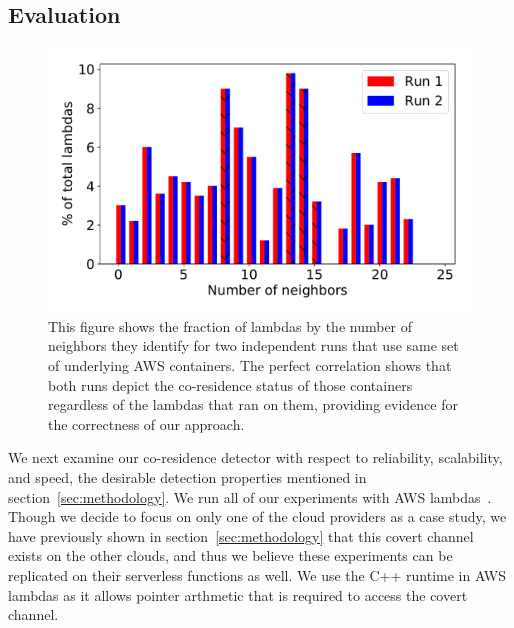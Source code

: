 \subsection{Evaluation}
\label{sec:eval}

\begin{figure}[!t]
  \includegraphics[width=.99\linewidth]{fig/correlation.pdf}
  \caption{This figure shows the fraction of lambdas by the number of neighbors 
  they identify for two independent runs that use same set of underlying AWS
  containers. The perfect correlation shows that both runs depict the co-residence 
  status of those containers regardless of the lambdas that ran on them, providing
  evidence for the correctness of our approach.
\label{fig:correlation}}
\end{figure}


We next examine our co-residence detector with respect to reliability,
scalability, and speed, the desirable detection properties mentioned in
section~\ref{sec:methodology}.  We run all of our experiments with AWS
lambdas~\cite{awscloud}. Though we decide to focus on only one of the cloud
providers as a case study, we have previously shown in
section~\ref{sec:methodology} that this covert channel exists on the other
clouds, and thus we believe these experiments can be replicated on their serverless
functions as well. We use the C++ runtime in AWS lambdas as it allows pointer
arthmetic that is required to access the covert channel.

